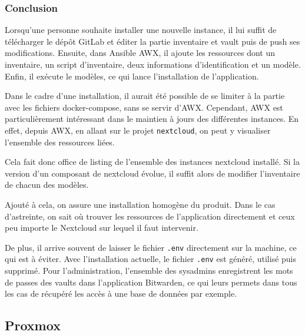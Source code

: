 \documentclass[12pt]{article}
\begin{document}
\subsubsection{Conclusion}
Lorsqu'une personne souhaite installer une nouvelle instance, il lui suffit de télécharger le dépôt GitLab et éditer la partie inventaire et vault puis de push ses modifications. Ensuite, dans Ansible AWX, il ajoute les ressources dont un inventaire, un script d'inventaire, deux informations d'identification et un modèle. Enfin, il exécute le modèles, ce qui lance l'installation de l'application.

Dans le cadre d'une installation, il aurait été possible de se limiter à la partie avec les fichiers docker-compose, sans se servir d'AWX. Cependant, AWX est particulièrement intéressant dans le maintien à jours des différentes instances. En effet, depuis AWX, en allant sur le projet \verb|nextcloud|, on peut y visualiser l'ensemble des ressources liées.

Cela fait donc office de listing de l'ensemble des instances nextcloud installé. Si la version d'un composant de nextcloud évolue, il suffit alors de modifier l'inventaire de chacun des modèles.

Ajouté à cela, on assure une installation homogène du produit. Dans le cas d'astreinte, on sait où trouver les ressources de l'application directement et ceux peu importe le Nextcloud sur lequel il faut intervenir.

De plus, il arrive souvent de laisser le fichier \verb|.env| directement sur la machine, ce qui est à éviter. Avec l'installation actuelle, le fichier \verb|.env| est généré, utilisé puis supprimé. Pour l'administration, l'ensemble des sysadmins enregistrent les mots de passes des vaults dans l'application Bitwarden, ce qui leurs permets dans tous les cas de récupéré les accès à une base de données par exemple.

\newpage
\subsection{Proxmox}
\end{document}
